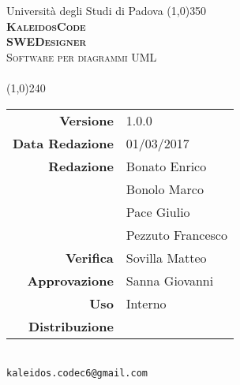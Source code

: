 \documentclass[a4paper,12pt]{article}
\author{KaleidosCode}
\date{03/03/2017}	%
\begin{document}
	\begin{titlepage}
		\centering Università degli Studi di Padova
		\line(1,0){350}\\
		\vspace{0.4cm}
		{\bfseries\scshape\LARGE KaleidosCode\\}
		\vspace{0.4cm}
		{\bfseries\scshape\LARGE SWEDesigner\\}
		{\scshape\Large Software per diagrammi UML\\}
		\vspace{1cm}
		{\scshape\Large \normediprogettoi\ \\}		%
		\vspace{1.4cm}
		\logo
		\vspace{1.2cm}
		\line(1,0){240}\\
		\begin{tabular}{r|l}
			{\hfill \textbf{Versione}} 			& 1.0.0\\
			{\hfill \textbf{Data Redazione}} 	& 01/03/2017\\	%
			{\hfill \textbf{Redazione}} 		& Bonato Enrico\\ & Bonolo Marco\\ & Pace Giulio\\ & Pezzuto Francesco\\
			{\hfill \textbf{Verifica}} 			& Sovilla Matteo\\
			{\hfill \textbf{Approvazione}} 		& Sanna Giovanni\\
			{\hfill \textbf{Uso}} 				& Interno\\
			{\hfill \textbf{Distribuzione}} 	& \kaleidoscode\\
		\end{tabular}\\
		\vspace{2cm}
		\texttt{kaleidos.codec6@gmail.com}
	\end{titlepage}

	\pagestyle{myfront}
	\newpage
		
	\newpage
		\tableofcontents
	\newpage
	\pagestyle{mymain}
		
	\newpage
		
	\newpage
		
	\newpage
		
	\newpage
		
	\appendix
	\newpage
		
	\label{LastPage}
\end{document}
